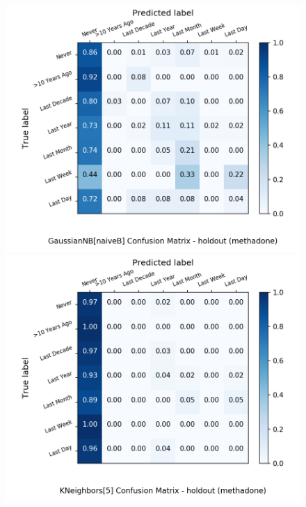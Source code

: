 \begin{figure}[H]
	\begin{minipage}[b]{0.32\textwidth}
		\includegraphics[width=1.1\textwidth]{Plots/drugs/methadone_GaussianNB_naiveB_balance_False_holdout.png}
	\end{minipage}
	\begin{minipage}[b]{0.32\textwidth}
		\includegraphics[width=1.1\textwidth]{Plots/drugs/methadone_KNeighbors_5_balance_False_holdout.png}
  \end{minipage}
	\begin{minipage}[b]{0.32\textwidth}

\end{minipage}
\end{figure}
